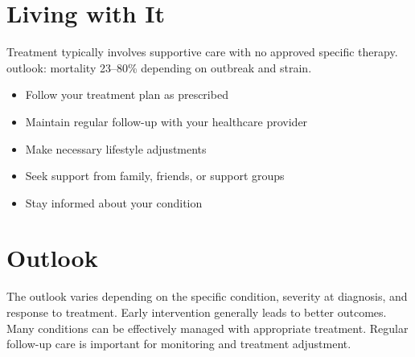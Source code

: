 \section{Living with It}
Treatment typically involves supportive care with no approved specific therapy. outlook: mortality 23--80\% depending on outbreak and strain.

\begin{itemize}[noitemsep]
  \item Follow your treatment plan as prescribed
  \item Maintain regular follow-up with your healthcare provider
  \item Make necessary lifestyle adjustments
  \item Seek support from family, friends, or support groups
  \item Stay informed about your condition
\end{itemize}
\section{Outlook}
The outlook varies depending on the specific condition, severity at diagnosis, and response to treatment. Early intervention generally leads to better outcomes. Many conditions can be effectively managed with appropriate treatment. Regular follow-up care is important for monitoring and treatment adjustment.
